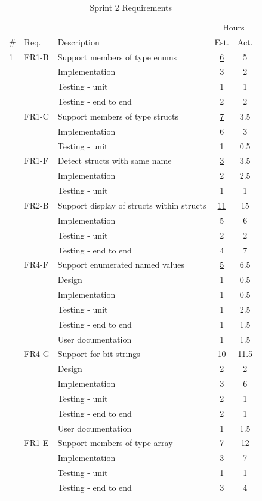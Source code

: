 \begin{table}[!htb] \small \center
\caption{Sprint 2 Requirements\label{tab:sprint2req1}}
\begin{tabularx}{\textwidth}{l l X c c}
	\toprule
	& & & \multicolumn{2}{c}{Hours} \\
	\cmidrule(r){4-5}
	\# & Req. & Description & Est. & Act. \\
	\midrule
	1 & FR1-B & Support members of type enums & \underline{ 6 } & 5 \\
	   &  & Implementation & 3 & 2 \\
	   &  & Testing - unit & 1 & 1 \\
	   &  & Testing - end to end & 2 & 2 \\
	\addlinespace
	2 & FR1-C & Support members of type structs & \underline{ 7 } & 3.5 \\
	   &  & Implementation & 6 & 3 \\
	   &  & Testing - unit & 1 & 0.5 \\
	\addlinespace
	3 & FR1-F & Detect structs with same name & \underline{ 3 } & 3.5 \\
	   &  & Implementation & 2 & 2.5 \\
	   &  & Testing - unit & 1 & 1 \\
	\addlinespace
	4 & FR2-B & Support display of structs within structs & \underline{ 11 } & 15 \\
	   &  & Implementation & 5 & 6 \\
	   &  & Testing - unit & 2 & 2 \\
	   &  & Testing - end to end & 4 & 7 \\
	\addlinespace
	5 & FR4-F & Support enumerated named values & \underline{ 5 } & 6.5 \\
	   &  & Design & 1 & 0.5 \\
	   &  & Implementation & 1 & 0.5 \\
	   &  & Testing - unit & 1 & 2.5 \\
	   &  & Testing - end to end & 1 & 1.5 \\
	   &  & User documentation & 1 & 1.5 \\
	\addlinespace
	6 & FR4-G & Support for bit strings & \underline{ 10 } & 11.5 \\
	   &  & Design & 2 & 2 \\
	   &  & Implementation & 3 & 6 \\
	   &  & Testing - unit & 2 & 1 \\
	   &  & Testing - end to end & 2 & 1 \\
	   &  & User documentation & 1 & 1.5 \\
	\addlinespace
	7 & FR1-E & Support members of type array & \underline{ 7 } & 12 \\
	   &  & Implementation & 3 & 7 \\
	   &  & Testing - unit & 1 & 1 \\
	   &  & Testing - end to end & 3 & 4 \\
	\bottomrule
\end{tabularx}
\end{table}


